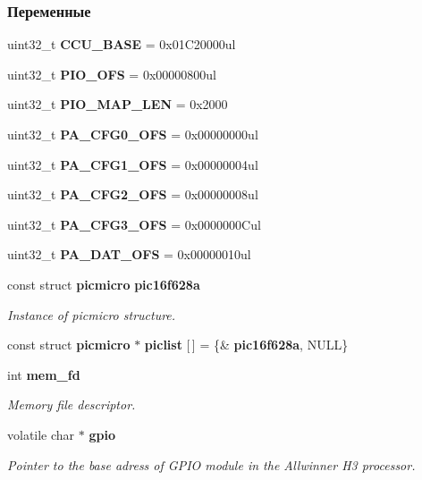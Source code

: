 \subsubsection*{Переменные}
\begin{DoxyCompactItemize}
\item 
\mbox{\label{rpp_8c_a3289f58977f0a569ee34d34d1406561d}} 
uint32\+\_\+t {\bfseries C\+C\+U\+\_\+\+B\+A\+SE} = 0x01\+C20000ul
\item 
\mbox{\label{rpp_8c_a42161421b7792c915a16e00cf2895554}} 
uint32\+\_\+t {\bfseries P\+I\+O\+\_\+\+O\+FS} = 0x00000800ul
\item 
\mbox{\label{rpp_8c_a49f2832a845e21b4641e9c1cde0bec40}} 
uint32\+\_\+t {\bfseries P\+I\+O\+\_\+\+M\+A\+P\+\_\+\+L\+EN} = 0x2000
\item 
\mbox{\label{rpp_8c_ad3ff5c2ee4c4c1c84aa009c461eff654}} 
uint32\+\_\+t {\bfseries P\+A\+\_\+\+C\+F\+G0\+\_\+\+O\+FS} = 0x00000000ul
\item 
\mbox{\label{rpp_8c_a90ad48d427b62cb1784057af1f12ba65}} 
uint32\+\_\+t {\bfseries P\+A\+\_\+\+C\+F\+G1\+\_\+\+O\+FS} = 0x00000004ul
\item 
\mbox{\label{rpp_8c_a9fcf12c5a641077f188909888c87fd34}} 
uint32\+\_\+t {\bfseries P\+A\+\_\+\+C\+F\+G2\+\_\+\+O\+FS} = 0x00000008ul
\item 
\mbox{\label{rpp_8c_aa9062c455e751e0152b14883dbf8ec3e}} 
uint32\+\_\+t {\bfseries P\+A\+\_\+\+C\+F\+G3\+\_\+\+O\+FS} = 0x0000000\+Cul
\item 
\mbox{\label{rpp_8c_a7a604365700da4bdc3b6fc346481c227}} 
uint32\+\_\+t {\bfseries P\+A\+\_\+\+D\+A\+T\+\_\+\+O\+FS} = 0x00000010ul
\item 
const struct \textbf{ picmicro} \textbf{ pic16f628a}
\begin{DoxyCompactList}\small\item\em Instance of picmicro structure. \end{DoxyCompactList}\item 
\mbox{\label{rpp_8c_a5c0b7212efd675a6004af9632bb18084}} 
const struct \textbf{ picmicro} $\ast$ {\bfseries piclist} [$\,$] = \{\&\textbf{ pic16f628a}, N\+U\+LL\}
\item 
int \textbf{ mem\+\_\+fd}
\begin{DoxyCompactList}\small\item\em Memory file descriptor. \end{DoxyCompactList}\item 
\mbox{\label{rpp_8c_aebda620535a14d07f0a5e077e9fcdac9}} 
volatile char $\ast$ \textbf{ gpio}
\begin{DoxyCompactList}\small\item\em Pointer to the base adress of G\+P\+IO module in the Allwinner H3 processor. \end{DoxyCompactList}\end{DoxyCompactItemize}


